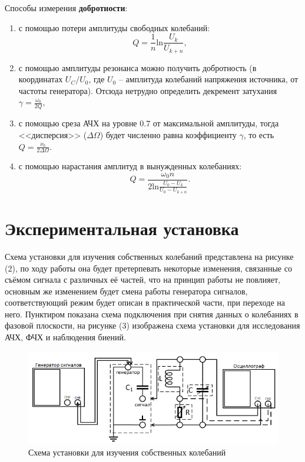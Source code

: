 \documentclass[a4paper,12pt]{extarticle}
\begin{document}
Способы измерения \textbf{добротности}:
\begin{enumerate}
    \item с помощью потери амплитуды свободных колебаний:
    \begin{equation}
        Q = \frac{1}{n} \text{ln}\frac{U_k}{U_{k+n}},
    \end{equation}
    \item с помощью амплитуды резонанса можно получить добротность (в координатах $U_C/U_0$, где $U_0$ -- амплитуда колебаний напряжения источника, от частоты генератора). Отсюда нетрудно определить декремент затухания $\gamma = \frac{\omega_0}{2Q}$,
    \item с помощью среза АЧХ на уровне 0.7 от максимальной амплитуды, тогда <<дисперсия>> ($\Delta \Omega$) будет численно равна коэффициенту $\gamma$, то есть $Q = \frac{\nu_0}{2 \Delta \Omega}$.
    \item с помощью нарастания амплитуд в вынужденных колебаниях:
    \begin{equation}
        Q = \frac{\omega_0 n}{2\text{ln} \frac{U_0 - U_k}{U_0 - U_{k+n}}}.
    \end{equation}
\end{enumerate}

\newpage
\section{Экспериментальная установка}
Схема установки для изучения собственных колебаний представлена на рисунке (2), по ходу работы она будет претерпевать некоторые изменения, связанные со съёмом сигнала с различных её частей, что на принцип работы не повлияет, основным же изменением будет смена работы генератора сигналов, соответствующий режим будет описан в практической части, при переходе на него. Пунктиром показана схема подключения при снятия данных о колебаниях в фазовой плоскости, на рисунке (3) изображена схема установки для исследования АЧХ, ФЧХ и наблюдения биений.

\begin{figure}[h!]
    \centering
    \includegraphics[width=0.8\linewidth]{ustan1.png}
    \caption{Схема установки для изучения собственных колебаний}
\end{figure}
\end{document}
